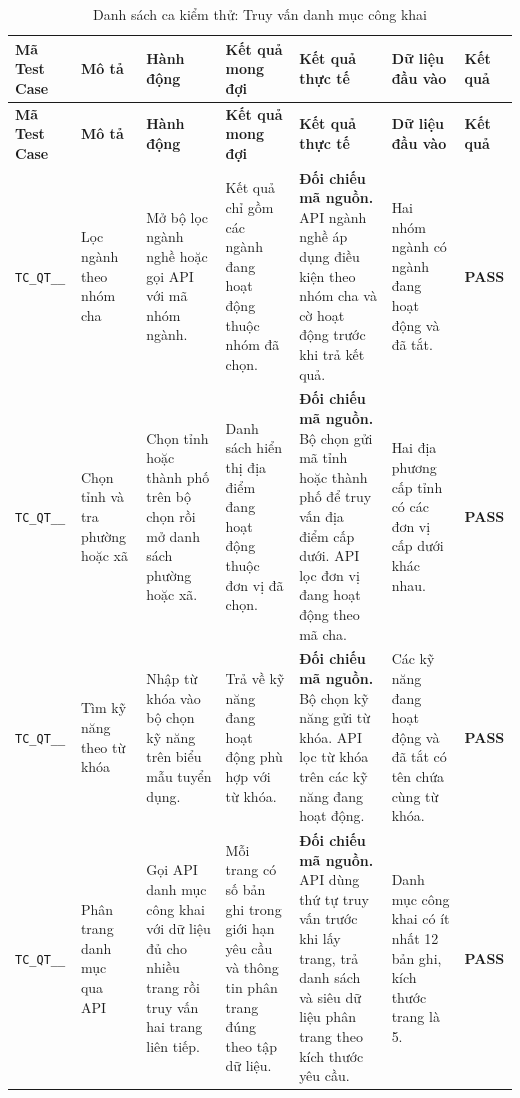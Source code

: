 \begin{landscape}
{
\fontsize{9.5}{11.5}\selectfont
\setlength{\tabcolsep}{3pt}
\renewcommand{\arraystretch}{1.2}
\begin{longtable}{|>{\raggedright\arraybackslash}p{2.1cm}|>{\raggedright\arraybackslash}p{2.8cm}|>{\raggedright\arraybackslash}p{3.8cm}|>{\raggedright\arraybackslash}p{4.0cm}|>{\raggedright\arraybackslash}p{5.0cm}|>{\raggedright\arraybackslash}p{3.2cm}|>{\centering\arraybackslash}p{1.3cm}|}
    \caption{Danh sách ca kiểm thử: Truy vấn danh mục công khai} \label{tab:ts-qt-06} \\
    \hline
    \textbf{Mã Test Case} & \textbf{Mô tả} & \textbf{Hành động} & \textbf{Kết quả mong đợi} & \textbf{Kết quả thực tế} & \textbf{Dữ liệu đầu vào} & \textbf{Kết quả} \\
    \hline
    \endfirsthead
    \hline
    \textbf{Mã Test Case} & \textbf{Mô tả} & \textbf{Hành động} & \textbf{Kết quả mong đợi} & \textbf{Kết quả thực tế} & \textbf{Dữ liệu đầu vào} & \textbf{Kết quả} \\
    \hline
    \endhead
    \hline
    \endfoot
    \hline
    \endlastfoot
    \texttt{TC\_\allowbreak QT\_\allowbreak 06\_\allowbreak 01} & Lọc ngành theo nhóm cha & Mở bộ lọc ngành nghề hoặc gọi API với mã nhóm ngành. & Kết quả chỉ gồm các ngành đang hoạt động thuộc nhóm đã chọn. & \textbf{Đối chiếu mã nguồn.} API ngành nghề áp dụng điều kiện theo nhóm cha và cờ hoạt động trước khi trả kết quả. & Hai nhóm ngành có ngành đang hoạt động và đã tắt. & \textbf{PASS} \\
    \hline
    \texttt{TC\_\allowbreak QT\_\allowbreak 06\_\allowbreak 02} & Chọn tỉnh và tra phường hoặc xã & Chọn tỉnh hoặc thành phố trên bộ chọn rồi mở danh sách phường hoặc xã. & Danh sách hiển thị địa điểm đang hoạt động thuộc đơn vị đã chọn. & \textbf{Đối chiếu mã nguồn.} Bộ chọn gửi mã tỉnh hoặc thành phố để truy vấn địa điểm cấp dưới. API lọc đơn vị đang hoạt động theo mã cha. & Hai địa phương cấp tỉnh có các đơn vị cấp dưới khác nhau. & \textbf{PASS} \\
    \hline
    \texttt{TC\_\allowbreak QT\_\allowbreak 06\_\allowbreak 03} & Tìm kỹ năng theo từ khóa & Nhập từ khóa vào bộ chọn kỹ năng trên biểu mẫu tuyển dụng. & Trả về kỹ năng đang hoạt động phù hợp với từ khóa. & \textbf{Đối chiếu mã nguồn.} Bộ chọn kỹ năng gửi từ khóa. API lọc từ khóa trên các kỹ năng đang hoạt động. & Các kỹ năng đang hoạt động và đã tắt có tên chứa cùng từ khóa. & \textbf{PASS} \\
    \hline
    \texttt{TC\_\allowbreak QT\_\allowbreak 06\_\allowbreak 04} & Phân trang danh mục qua API & Gọi API danh mục công khai với dữ liệu đủ cho nhiều trang rồi truy vấn hai trang liên tiếp. & Mỗi trang có số bản ghi trong giới hạn yêu cầu và thông tin phân trang đúng theo tập dữ liệu. & \textbf{Đối chiếu mã nguồn.} API dùng thứ tự truy vấn trước khi lấy trang, trả danh sách và siêu dữ liệu phân trang theo kích thước yêu cầu. & Danh mục công khai có ít nhất 12 bản ghi, kích thước trang là 5. & \textbf{PASS} \\

\end{longtable}}
\end{landscape}
